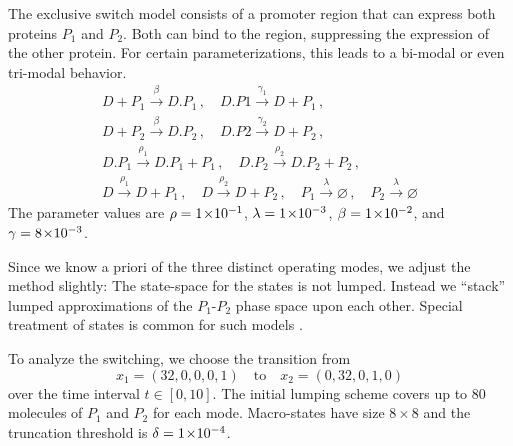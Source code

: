 \begin{model}\label{model:excl_switch_2} The
  exclusive switch model consists of a promoter region
  that can express both proteins $P_1$ and $P_2$. Both can bind to
  the region, suppressing
  the expression of the other protein. For certain parameterizations,
  this leads to a
  bi-modal or even tri-modal behavior.
  \begin{gather*}
    D + P_1 \xrightarrow{\beta} D.P_1\,,\quad
    D.P1 \xrightarrow{\gamma_1} D + P_1  \,,\\
    D + P_2 \xrightarrow{\beta} D.P_2 \,,\quad
    D.P2 \xrightarrow{\gamma_2} D + P_2 \,,\\
    D.P_1 \xrightarrow{\rho_1} D.P_1 + P_1\,, \quad
    D.P_2 \xrightarrow{\rho_2} D.P_2 + P_2\,,\\
    D \xrightarrow{\rho_1} D + P_1\,,\quad
    D \xrightarrow{\rho_2} D + P_2\,,  \quad
    P_1 \xrightarrow{\lambda}\varnothing  \,,\quad
    P_2\xrightarrow{\lambda} \varnothing
  \end{gather*}
  The parameter values are $\rho= 1\!\times\hspace{-.5ex} 10^{-1} $, $\lambda= 1\!\times\hspace{-.5ex} 10^{-3} $,
  $\beta= 1\!\times\hspace{-.5ex} 10^{-2} $, and $\gamma= 8\!\times\hspace{-.5ex} 10^{-3} $.
\end{model}
Since we know a priori of the three distinct operating modes, we adjust
the method slightly:
The state-space for the  states is not lumped. Instead we ``stack''
lumped approximations of the $P_1$-$P_2$ phase space upon each other.
Special treatment of  states is common for such models
\parencite{lapin2011shave}.

To analyze the switching, we choose the transition
from
\[
  x_{1} = (32, 0, 0, 0, 1)
  \quad
  \text{to}
  \quad
  x_2 = (0, 32, 0, 1, 0)
\]
over the time interval $t\in[0,10]$.
The initial lumping scheme covers up to \num{80} molecules of $P_1$
and $P_2$ for each mode.
Macro-states have size $8\times8$ and
the truncation threshold is $\delta= 1\!\times\hspace{-.5ex} 10^{-4} $.

